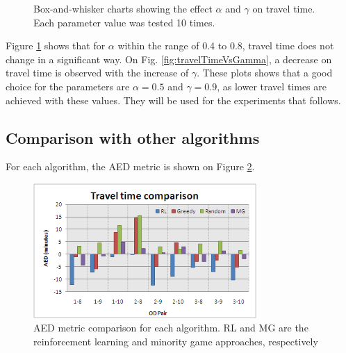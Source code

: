\documentclass{RITA}
\begin{document}
\begin{figure}[ht]
  \centering
  \caption{Box-and-whisker charts showing the effect $\alpha$ and $\gamma$ on travel time. Each parameter value was tested 10 times.}
  \label{fig:qLearningParams}
\end{figure}

Figure \ref{fig:qLearningParams} shows that for $\alpha$ within the range of 0.4 to 0.8, travel time does not change in a significant way. On Fig. \ref{fig:travelTimeVsGamma}, a decrease on travel time is observed with the increase of $\gamma$. These plots shows that a good choice for the parameters are $\alpha = 0.5$ and $\gamma = 0.9$, as lower travel times are achieved with these values. They will be used for the experiments that follows.

\subsection{Comparison with other algorithms}

For each algorithm, the AED metric is shown on Figure \ref{fig:travelTimeComparison}. 

\begin{figure}[ht]
    \centerline{\includegraphics[width=8.5cm]{img/travelTimeComparison.png}}
    \caption{AED metric comparison for each algorithm. RL and MG are the reinforcement learning and minority game approaches, respectively}
    \label{fig:travelTimeComparison}
\end{figure}
\end{document}
